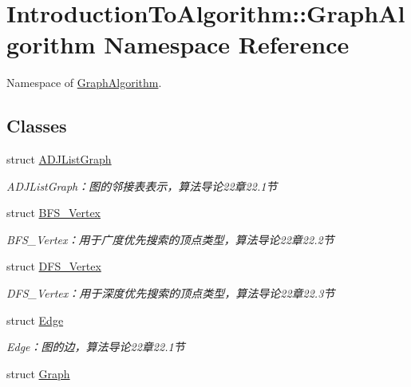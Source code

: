 \hypertarget{namespace_introduction_to_algorithm_1_1_graph_algorithm}{}\section{Introduction\+To\+Algorithm\+:\+:Graph\+Algorithm Namespace Reference}
\label{namespace_introduction_to_algorithm_1_1_graph_algorithm}


Namespace of \hyperlink{namespace_introduction_to_algorithm_1_1_graph_algorithm}{Graph\+Algorithm}.  


\subsection*{Classes}
\begin{DoxyCompactItemize}
\item 
struct \hyperlink{struct_introduction_to_algorithm_1_1_graph_algorithm_1_1_a_d_j_list_graph}{A\+D\+J\+List\+Graph}
\begin{DoxyCompactList}\small\item\em A\+D\+J\+List\+Graph：图的邻接表表示，算法导论22章22.1节 \end{DoxyCompactList}\item 
struct \hyperlink{struct_introduction_to_algorithm_1_1_graph_algorithm_1_1_b_f_s___vertex}{B\+F\+S\+\_\+\+Vertex}
\begin{DoxyCompactList}\small\item\em B\+F\+S\+\_\+\+Vertex：用于广度优先搜索的顶点类型，算法导论22章22.2节 \end{DoxyCompactList}\item 
struct \hyperlink{struct_introduction_to_algorithm_1_1_graph_algorithm_1_1_d_f_s___vertex}{D\+F\+S\+\_\+\+Vertex}
\begin{DoxyCompactList}\small\item\em D\+F\+S\+\_\+\+Vertex：用于深度优先搜索的顶点类型，算法导论22章22.3节 \end{DoxyCompactList}\item 
struct \hyperlink{struct_introduction_to_algorithm_1_1_graph_algorithm_1_1_edge}{Edge}
\begin{DoxyCompactList}\small\item\em Edge：图的边，算法导论22章22.1节 \end{DoxyCompactList}\item 
struct \hyperlink{struct_introduction_to_algorithm_1_1_graph_algorithm_1_1_graph}{Graph}

\end{DoxyCompactItemize}
